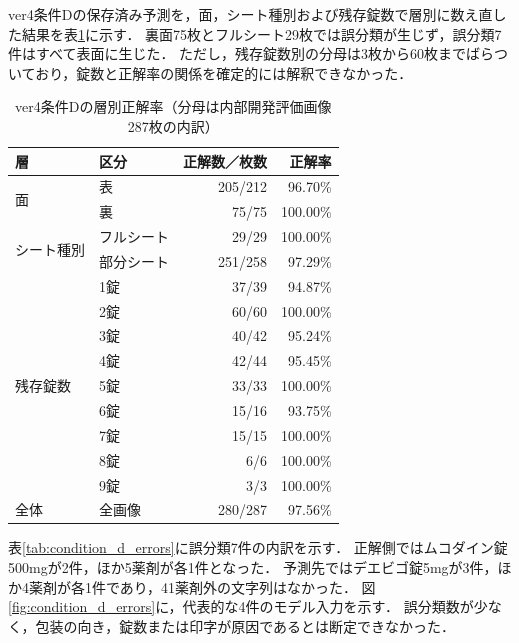 \documentclass[uplatex,dvipdfmx]{jsarticle}
\begin{document}
ver4条件Dの保存済み予測を，面，シート種別および残存錠数で層別に数え直した結果を表\ref{tab:condition_d_stratified}に示す．
裏面75枚とフルシート29枚では誤分類が生じず，誤分類7件はすべて表面に生じた．
ただし，残存錠数別の分母は3枚から60枚までばらついており，錠数と正解率の関係を確定的には解釈できなかった．

\begin{table}[htbp]
  \centering
  \caption{ver4条件Dの層別正解率（分母は内部開発評価画像287枚の内訳）}
  \label{tab:condition_d_stratified}
  \small
  \begin{tabular}{|l|l|r|r|}
    \hline
    層 & 区分 & 正解数／枚数 & 正解率 \\ \hline
    \multirow{2}{*}{面} & 表 & 205/212 & 96.70\% \\ \cline{2-4}
     & 裏 & 75/75 & 100.00\% \\ \hline
    \multirow{2}{*}{シート種別} & フルシート & 29/29 & 100.00\% \\ \cline{2-4}
     & 部分シート & 251/258 & 97.29\% \\ \hline
    \multirow{9}{*}{残存錠数} & 1錠 & 37/39 & 94.87\% \\ \cline{2-4}
     & 2錠 & 60/60 & 100.00\% \\ \cline{2-4}
     & 3錠 & 40/42 & 95.24\% \\ \cline{2-4}
     & 4錠 & 42/44 & 95.45\% \\ \cline{2-4}
     & 5錠 & 33/33 & 100.00\% \\ \cline{2-4}
     & 6錠 & 15/16 & 93.75\% \\ \cline{2-4}
     & 7錠 & 15/15 & 100.00\% \\ \cline{2-4}
     & 8錠 & 6/6 & 100.00\% \\ \cline{2-4}
     & 9錠 & 3/3 & 100.00\% \\ \hline
    全体 & 全画像 & 280/287 & 97.56\% \\ \hline
  \end{tabular}
\end{table}

表\ref{tab:condition_d_errors}に誤分類7件の内訳を示す．
正解側ではムコダイン錠500mgが2件，ほか5薬剤が各1件となった．
予測先ではデエビゴ錠5mgが3件，ほか4薬剤が各1件であり，41薬剤外の文字列はなかった．
図\ref{fig:condition_d_errors}に，代表的な4件のモデル入力を示す．
誤分類数が少なく，包装の向き，錠数または印字が原因であるとは断定できなかった．
\end{document}
